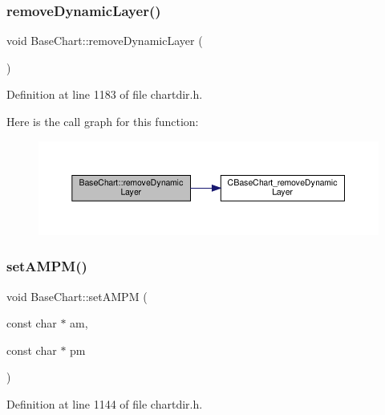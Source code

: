 \subsubsection{\texorpdfstring{remove\+Dynamic\+Layer()}{removeDynamicLayer()}}
{\footnotesize\ttfamily void Base\+Chart\+::remove\+Dynamic\+Layer (\begin{DoxyParamCaption}{ }\end{DoxyParamCaption})\hspace{0.3cm}{\ttfamily [inline]}}



Definition at line 1183 of file chartdir.\+h.

Here is the call graph for this function\+:
\nopagebreak
\begin{figure}[H]
\begin{center}
\leavevmode
\includegraphics[width=350pt]{class_base_chart_a89dc9e3a549543beff75c430c42887ca_cgraph}
\end{center}
\end{figure}
\mbox{\label{class_base_chart_a41ba33ec1d9c3dd835653dc63571f2bf}} 
\subsubsection{\texorpdfstring{set\+A\+M\+P\+M()}{setAMPM()}}
{\footnotesize\ttfamily void Base\+Chart\+::set\+A\+M\+PM (\begin{DoxyParamCaption}\item[{const char $\ast$}]{am,  }\item[{const char $\ast$}]{pm }\end{DoxyParamCaption})\hspace{0.3cm}{\ttfamily [inline]}}



Definition at line 1144 of file chartdir.\+h.

